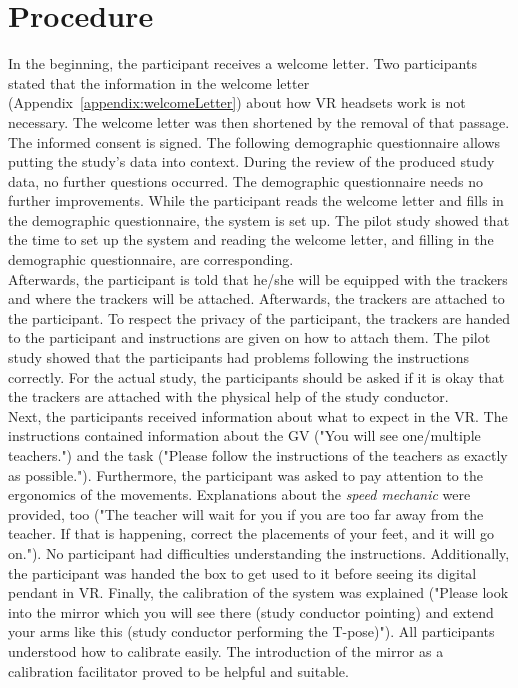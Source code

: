 \section{Procedure}
\label{sec:evalProcedure}
In the beginning, the participant receives a welcome letter. Two participants stated that the information in the welcome letter (Appendix~\ref{appendix:welcomeLetter}) about how VR headsets work is not necessary. The welcome letter was then shortened by the removal of that passage. The informed consent is signed. The following demographic questionnaire allows putting the study's data into context. During the review of the produced study data, no further questions occurred. The demographic questionnaire needs no further improvements. While the participant reads the welcome letter and fills in the demographic questionnaire, the system is set up. The pilot study showed that the time to set up the system and reading the welcome letter, and filling in the demographic questionnaire, are corresponding.\\
Afterwards, the participant is told that he/she will be equipped with the trackers and where the trackers will be attached. Afterwards, the trackers are attached to the participant. To respect the privacy of the participant, the trackers are handed to the participant and instructions are given on how to attach them. The pilot study showed that the participants had problems following the instructions correctly. For the actual study, the participants should be asked if it is okay that the trackers are attached with the physical help of the study conductor.\\
Next, the participants received information about what to expect in the VR. The instructions contained information about the GV ("You will see one/multiple teachers.") and the task ("Please follow the instructions of the teachers as exactly as possible."). Furthermore, the participant was asked to pay attention to the ergonomics of the movements. Explanations about the \textit{speed mechanic} were provided, too ("The teacher will wait for you if you are too far away from the teacher. If that is happening, correct the placements of your feet, and it will go on."). No participant had difficulties understanding the instructions. Additionally, the participant was handed the box to get used to it before seeing its digital pendant in VR. Finally, the calibration of the system was explained ("Please look into the mirror which you will see there (study conductor pointing) and extend your arms like this (study conductor performing the T-pose)"). All participants understood how to calibrate easily. The introduction of the mirror as a calibration facilitator proved to be helpful and suitable.\\
